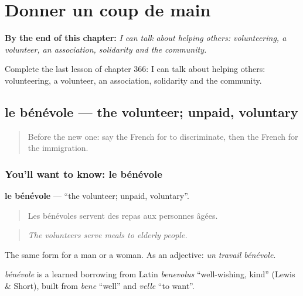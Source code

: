 
\chapter{Donner un coup de main}
\label{ch:fr-donner-un-coup-de-main}

\begin{chapteropening}
\textbf{By the end of this chapter:} \emph{I can talk about helping others: volunteering, a volunteer, an association, solidarity and the community.}

Complete the last lesson of chapter 366: I can talk about helping others: volunteering, a volunteer, an association, solidarity and the community.
\end{chapteropening}

\section[le bénévole]{le bénévole — the volunteer; unpaid, voluntary}

\label{lesson:FR-C366-benevole}



\begin{quote}
Before the new one: say the French for to discriminate, then the French for the immigration.
\end{quote}

\subsection*{You'll want to know: le bénévole}
\textbf{le bénévole} — \textquotedblleft{}the volunteer; unpaid, voluntary\textquotedblright{}.

\begin{quote}
Les bénévoles servent des repas aux personnes âgées.
\end{quote}

\begin{quote}
\emph{The volunteers serve meals to elderly people.}
\end{quote}

The same form for a man or a woman. As an adjective: \emph{un travail bénévole}.

\begin{cousinweb}
\emph{bénévole} is a learned borrowing from Latin \emph{benevolus} \textquotedblleft{}well-wishing, kind\textquotedblright{} (Lewis \& Short), built from \emph{bene} \textquotedblleft{}well\textquotedblright{} and \emph{velle} \textquotedblleft{}to want\textquotedblright{}.
\end{cousinweb}

